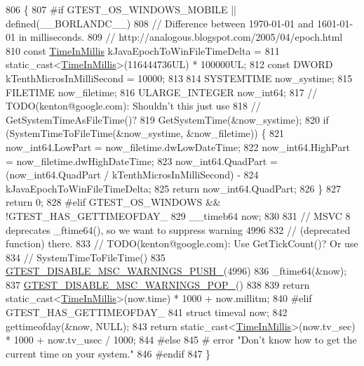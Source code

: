 \begin{DoxyCode}
806                                \{
807 \textcolor{preprocessor}{#if GTEST\_OS\_WINDOWS\_MOBILE || defined(\_\_BORLANDC\_\_)}
808   \textcolor{comment}{// Difference between 1970-01-01 and 1601-01-01 in milliseconds.}
809   \textcolor{comment}{// http://analogous.blogspot.com/2005/04/epoch.html}
810   \textcolor{keyword}{const} \hyperlink{namespacetesting_a992de1d091ce660f451d1e8b3ce30fd6}{TimeInMillis} kJavaEpochToWinFileTimeDelta =
811     \textcolor{keyword}{static\_cast<}\hyperlink{namespacetesting_a992de1d091ce660f451d1e8b3ce30fd6}{TimeInMillis}\textcolor{keyword}{>}(116444736UL) * 100000UL;
812   \textcolor{keyword}{const} DWORD kTenthMicrosInMilliSecond = 10000;
813 
814   SYSTEMTIME now\_systime;
815   FILETIME now\_filetime;
816   ULARGE\_INTEGER now\_int64;
817   \textcolor{comment}{// TODO(kenton@google.com): Shouldn't this just use}
818   \textcolor{comment}{//   GetSystemTimeAsFileTime()?}
819   GetSystemTime(&now\_systime);
820   \textcolor{keywordflow}{if} (SystemTimeToFileTime(&now\_systime, &now\_filetime)) \{
821     now\_int64.LowPart = now\_filetime.dwLowDateTime;
822     now\_int64.HighPart = now\_filetime.dwHighDateTime;
823     now\_int64.QuadPart = (now\_int64.QuadPart / kTenthMicrosInMilliSecond) -
824       kJavaEpochToWinFileTimeDelta;
825     \textcolor{keywordflow}{return} now\_int64.QuadPart;
826   \}
827   \textcolor{keywordflow}{return} 0;
828 \textcolor{preprocessor}{#elif GTEST\_OS\_WINDOWS && !GTEST\_HAS\_GETTIMEOFDAY\_}
829   \_\_timeb64 now;
830 
831   \textcolor{comment}{// MSVC 8 deprecates \_ftime64(), so we want to suppress warning 4996}
832   \textcolor{comment}{// (deprecated function) there.}
833   \textcolor{comment}{// TODO(kenton@google.com): Use GetTickCount()?  Or use}
834   \textcolor{comment}{//   SystemTimeToFileTime()}
835   \hyperlink{gtest-port_8h_a86994cc68e844d8b82089c70408dfc61}{GTEST\_DISABLE\_MSC\_WARNINGS\_PUSH\_}(4996)
836   \_ftime64(&now);
837   \hyperlink{gtest-port_8h_ab4c44546d6d9aced68993b87b608fc06}{GTEST\_DISABLE\_MSC\_WARNINGS\_POP\_}()
838 
839   return static\_cast<\hyperlink{namespacetesting_a992de1d091ce660f451d1e8b3ce30fd6}{TimeInMillis}>(now.time) * 1000 + now.millitm;
840 \textcolor{preprocessor}{#elif GTEST\_HAS\_GETTIMEOFDAY\_}
841   \textcolor{keyword}{struct }timeval now;
842   gettimeofday(&now, NULL);
843   \textcolor{keywordflow}{return} \textcolor{keyword}{static\_cast<}\hyperlink{namespacetesting_a992de1d091ce660f451d1e8b3ce30fd6}{TimeInMillis}\textcolor{keyword}{>}(now.tv\_sec) * 1000 + now.tv\_usec / 1000;
844 #\textcolor{keywordflow}{else}
845 # error \textcolor{stringliteral}{"Don't know how to get the current time on your system."}
846 #endif
847 \}
\end{DoxyCode}
